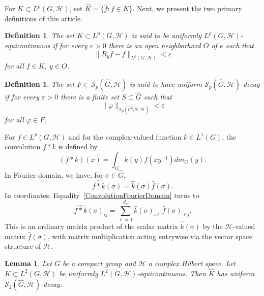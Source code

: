 \documentclass[11pt]{amsart}
\newtheorem{lemma}[theorem]{Lemma}
\newtheorem{definition}[theorem]{Definition}
\begin{document}
For $K\subset L^p(G,\mathcal{H})$,  set 
$\widehat K=\{\widehat f:f\in K\}$.
Next, we present the two primary definitions of this article.
\begin{definition}\label{def:equicont}
The set $K\subset L^p(G,\mathcal{H})$ is  said to be uniformly $L^p(G,\mathcal{H})$-equicontinuous if for every
$\varepsilon>0$ there is an open neighborhood $O$ of $e$ such that $$\|R_yf-f\|_{L^p(G,\mathcal{H})}
<\varepsilon$$ for all $f\in K,\ y\in O$.
\end{definition}

\begin{definition}\label{def:decay}
The set $F\subset \mathscr{S}_p(\widehat{G},\mathcal{H})$ is said to have uniform $ \mathscr{S}_p(\widehat{G},\mathcal{H})$-decay if for every
$\varepsilon>0$ there is a finite set $S\subset\widehat{G}$ such that  $$\|\varphi\|_{\mathscr{S}_p(\widehat{G}\setminus
S,\mathcal{H})}<\varepsilon$$ for all $\varphi\in F$.
\end{definition}

\bigskip

For $f\in L^p(G,\mathcal{H})$ and for the complex-valued function $k\in L^1(G)$, the convolution $f*k$ is defined by 
\begin{equation}\label{Convolution}
(f*k)(x)=\int_G k(y)f(xy^{-1})
dm_G(y).
\end{equation}
 In Fourier domain, we have, for $\sigma\in\widehat{G}$,
\begin{equation}\label{ConvolutionFourierDomain}
\widehat{f*k}(\sigma)=\widehat k(\sigma)\widehat f(\sigma).
\end{equation}
In coordinates,  Equality~\ref{ConvolutionFourierDomain} turns to $$\widehat{f*k}(\sigma)_{ij}=\sum_{\ell=1}^{d_\sigma}\widehat k(\sigma)_{i\ell}
\,\widehat{f}(\sigma)_{\ell j}.$$
This is an ordinary matrix product of the scalar
matrix $\widehat k(\sigma)$ by the $\mathcal{H}$-valued matrix $\widehat{f}(\sigma)$, with
matrix multiplication acting entrywise via the vector space structure of $\mathcal{H}$. 

\bigskip


\begin{lemma}\label{lem:decay}
Let $G$ be a compact group and $\mathcal{H}$ a complex Hilbert space. Let $K\subset L^2(G,\mathcal{H})$ be uniformly $L^2(G,\mathcal{H})$-equicontinuous. Then $\widehat K$
has uniform $\mathscr{S}_2(\widehat{G},\mathcal{H})$-decay.
\end{lemma}
\end{document}
